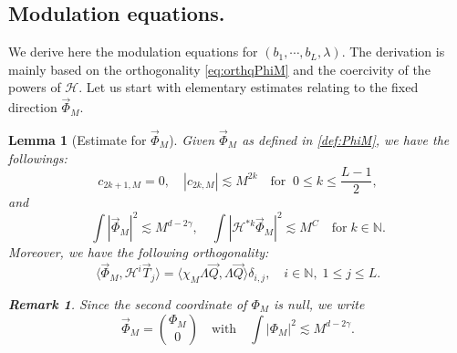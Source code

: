 \documentclass[11pt]{aims}
\newtheorem{lemma}[theorem]{Lemma}
\theoremstyle{definition}
\newtheorem{remark}[theorem]{Remark}
\numberwithin{equation}{section}
\begin{document}
\subsection{Modulation equations.}
We derive here the modulation equations for $(b_1,\cdots, b_L, \lambda)$. The derivation is mainly based on the orthogonality \eqref{eq:orthqPhiM} and the coercivity of the powers of ${\mathscr{H}}$. Let us start with elementary estimates relating to the fixed direction $\vec \Phi_M$.
\begin{lemma}[Estimate for $\vec \Phi_M$]\label{lemm:estPhiM} Given $\vec \Phi_M$ as defined in \eqref{def:PhiM}, we have the followings:
\begin{equation}\label{eq:boundckM}
c_{2k + 1, M} = 0, \quad |c_{2k,M}| \lesssim M^{2k} \quad \text{for}\;\; 0 \leq k \leq \frac{L-1}{2},
\end{equation}
and 
\begin{equation}\label{eq:boundPhiM2}
\int |\vec \Phi_M|^2 \lesssim M^{d-2\gamma}, \quad \int |{\mathscr{H}}^{*k} \vec \Phi_M|^2 \lesssim M^C \quad \text{for}\; k \in \mathbb{N}.
\end{equation}
Moreover, we have the following orthogonality: 
\begin{equation}\label{eq:ortPhiMTj}
\big\langle \vec \Phi_M, {\mathscr{H}}^i \vec T_j \big\rangle = \big \langle \chi_M \Lambda \vec Q, \Lambda \vec Q \big \rangle\delta_{i,j}, \quad i \in \mathbb{N}, \; 1 \leq j \leq L.
\end{equation}

\begin{remark} Since the second coordinate of $\Phi_M$ is null, we write 
\begin{equation}\label{def:PhiM1}
\vec \Phi_M = \binom{\Phi_M}{0} \quad \text{with} \quad \int |\Phi_M|^2 \lesssim M^{d - 2\gamma}.
\end{equation}
\end{remark}

\end{lemma}
\end{document}
